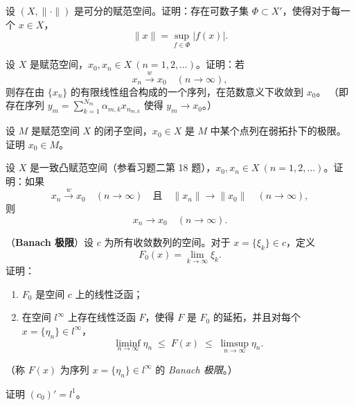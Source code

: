 \begin{homework}[3.17]
设 $(X,\|\cdot\|)$ 是可分的赋范空间。证明：存在可数子集 $\Phi\subset X'$，使得对于每一个 $x\in X$，
\[
\|x\|=\sup_{f\in\Phi}|f(x)|.
\]
\end{homework}

\begin{homework}[3.18]
设 $X$ 是赋范空间，$x_0,x_n\in X\ (n=1,2,\dots)$。证明：若
\[
x_n \xrightarrow{w} x_0\quad (n\to\infty),
\]
则存在由 $\{x_n\}$ 的有限线性组合构成的一个序列，在范数意义下收敛到 $x_0$。
（即存在序列 $y_m=\sum_{k=1}^{N_m}\alpha_{m,k}x_{n_{m,k}}$ 使得 $y_m\to x_0$。）
\end{homework}

\begin{homework}[3.19]
设 $M$ 是赋范空间 $X$ 的闭子空间，$x_0\in X$ 是 $M$ 中某个点列在弱拓扑下的极限。证明 $x_0\in M$。
\end{homework}

\begin{homework}[3.20]
设 $X$ 是一致凸赋范空间（参看习题二第 18 题），$x_0,x_n\in X\ (n=1,2,\dots)$。证明：如果
\[
x_n \xrightarrow{w} x_0\quad (n\to\infty)
\quad\text{且}\quad
\|x_n\|\longrightarrow\|x_0\|\quad (n\to\infty),
\]
则
\[
x_n\longrightarrow x_0\quad (n\to\infty).
\]
\end{homework}

\begin{homework}[3.21]
（\textbf{Banach 极限}）设 $c$ 为所有收敛数列的空间。对于 $x=\{\xi_k\}\in c$，定义
\[
F_0(x)=\lim_{k\to\infty}\xi_k.
\]
证明：
\begin{enumerate}
  \item $F_0$ 是空间 $c$ 上的线性泛函；
  \item 在空间 $l^\infty$ 上存在线性泛函 $F$，使得 $F$ 是 $F_0$ 的延拓，并且对每个
  $x=\{\eta_n\}\in l^\infty$，
  \[
    \liminf_{n\to\infty} \eta_n
      \;\le\; F(x)
      \;\le\; \limsup_{n\to\infty} \eta_n.
  \]
\end{enumerate}
（称 $F(x)$ 为序列 $x=\{\eta_n\}\in l^\infty$ 的 \emph{Banach 极限}。）
\end{homework}

\begin{homework}[3.23]
证明 $(c_0)'=l^1$。
\end{homework}

